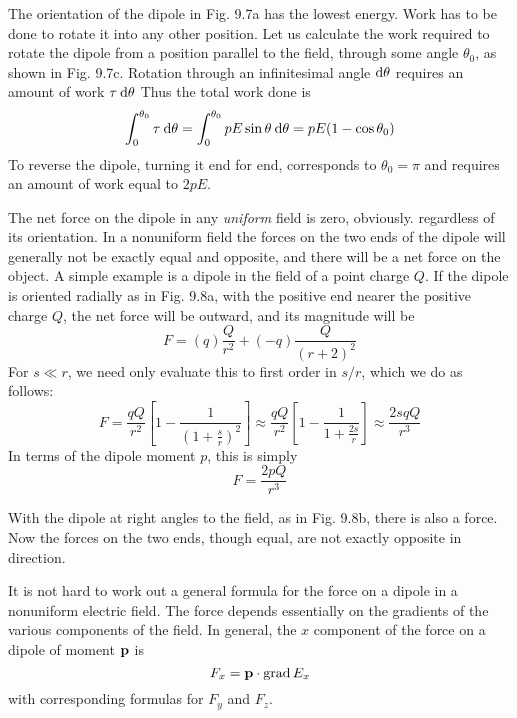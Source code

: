 
The orientation of the dipole in Fig. 9.7a has the lowest energy.
Work has to be done to rotate it into any other position. Let us calculate
the work required to rotate the dipole from a position parallel
to the field, through some angle $\theta_0$, as shown in Fig. 9.7c. Rotation
through an infinitesimal angle $\textup{d}\theta$ requires an amount of work $\tau\:\textup{d}\theta$
Thus the total work done is
\begin{equation}
  \int_0^{\theta_0} \tau\:\textup{d}\theta 
    = \int_0^{\theta_0} pE\sin\theta\:\textup{d}\theta
    = pE(1-\cos\theta_0)
\end{equation}
To reverse the dipole, turning it end for end, corresponds to $\theta_0=\pi$
and requires an amount of work equal to $2pE$.

The net force on the dipole in any \emph{uniform} field is zero, obviously.
regardless of its orientation. In a nonuniform field the forces on the
two ends of the dipole will generally not be exactly equal and 
opposite, and there will be a net force on the object. A simple example
is a dipole in the field of a point charge $Q$. If the dipole is oriented
radially as in Fig. 9.8a, with the positive end nearer the positive
charge $Q$, the net force will be outward, and its magnitude will be
\begin{equation}
  F = (q)\frac{Q}{r^2}+(-q)\frac{Q}{(r+2)^2}
\end{equation}
For $s\ll r$, we need only evaluate this to first order in $s/r$, which we
do as follows:
\begin{equation}
  F = \frac{qQ}{r^2}\left[1-\frac{1}{\left(1+\frac{s}{r}\right)^2}\right]
    \approx \frac{qQ}{r^2}\left[1-\frac{1}{1+\frac{2s}{r}}\right]
    \approx \frac{2sqQ}{r^3}
\end{equation}
In terms of the dipole moment $p$, this is simply
\begin{equation}
  F = \frac{2pQ}{r^3}
\end{equation}

With the dipole at right angles to the field, as in Fig. 9.8b, there is
also a force. Now the forces on the two ends, though equal, are not
exactly opposite in direction.

It is not hard to work out a general formula for the force on a dipole
in a nonuniform electric field. The force depends essentially on the
gradients of the various components of the field. In general, the
$x$ component of the force on a dipole of moment $\mathbf{p}$ is
\begin{equation}
  F_x = \mathbf{p}\cdot\operatorname{grad} E_x
\end{equation}
with corresponding formulas for $F_y$ and $F_z$.

